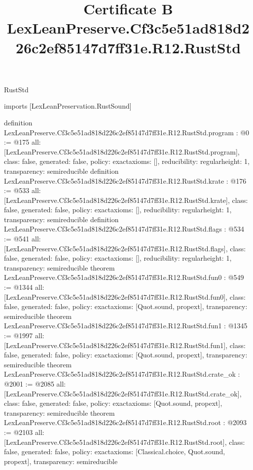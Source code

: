 \begin{lexlean}{RustStd}
\title{Certificate B LexLeanPreserve.Cf3c5e51ad818d226c2ef85147d7ff31e.R12.RustStd}
\begin{coremodule}
imports [LexLeanPreservation.RustSound]

definition LexLeanPreserve.Cf3c5e51ad818d226c2ef85147d7ff31e.R12.RustStd.program : @0 := @175 {
  all: [LexLeanPreserve.Cf3c5e51ad818d226c2ef85147d7ff31e.R12.RustStd.program],
  class: false,
  generated: false,
  policy: exact{axioms: []},
  reducibility: regular{height: 1},
  transparency: semireducible
}
definition LexLeanPreserve.Cf3c5e51ad818d226c2ef85147d7ff31e.R12.RustStd.krate : @176 := @533 {
  all: [LexLeanPreserve.Cf3c5e51ad818d226c2ef85147d7ff31e.R12.RustStd.krate],
  class: false,
  generated: false,
  policy: exact{axioms: []},
  reducibility: regular{height: 1},
  transparency: semireducible
}
definition LexLeanPreserve.Cf3c5e51ad818d226c2ef85147d7ff31e.R12.RustStd.flags : @534 := @541 {
  all: [LexLeanPreserve.Cf3c5e51ad818d226c2ef85147d7ff31e.R12.RustStd.flags],
  class: false,
  generated: false,
  policy: exact{axioms: []},
  reducibility: regular{height: 1},
  transparency: semireducible
}
theorem LexLeanPreserve.Cf3c5e51ad818d226c2ef85147d7ff31e.R12.RustStd.fun0 : @549 := @1344 {
  all: [LexLeanPreserve.Cf3c5e51ad818d226c2ef85147d7ff31e.R12.RustStd.fun0],
  class: false,
  generated: false,
  policy: exact{axioms: [Quot.sound, propext]},
  transparency: semireducible
}
theorem LexLeanPreserve.Cf3c5e51ad818d226c2ef85147d7ff31e.R12.RustStd.fun1 : @1345 := @1997 {
  all: [LexLeanPreserve.Cf3c5e51ad818d226c2ef85147d7ff31e.R12.RustStd.fun1],
  class: false,
  generated: false,
  policy: exact{axioms: [Quot.sound, propext]},
  transparency: semireducible
}
theorem LexLeanPreserve.Cf3c5e51ad818d226c2ef85147d7ff31e.R12.RustStd.crate_ok : @2001 := @2085 {
  all: [LexLeanPreserve.Cf3c5e51ad818d226c2ef85147d7ff31e.R12.RustStd.crate_ok],
  class: false,
  generated: false,
  policy: exact{axioms: [Quot.sound, propext]},
  transparency: semireducible
}
theorem LexLeanPreserve.Cf3c5e51ad818d226c2ef85147d7ff31e.R12.RustStd.root : @2093 := @2103 {
  all: [LexLeanPreserve.Cf3c5e51ad818d226c2ef85147d7ff31e.R12.RustStd.root],
  class: false,
  generated: false,
  policy: exact{axioms: [Classical.choice, Quot.sound, propext]},
  transparency: semireducible
}


\end{coremodule}
\end{lexlean}
